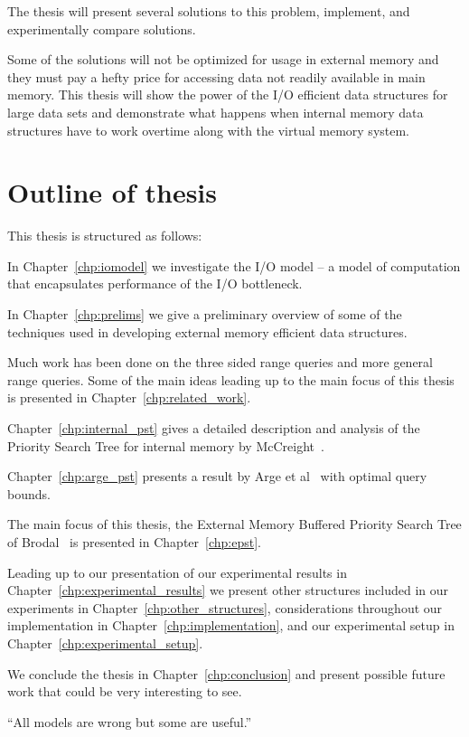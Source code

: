 \documentclass[twoside,11pt,openright]{report}
\begin{document}
The thesis will present several solutions to this problem, implement, and experimentally compare solutions.

Some of the solutions will not be optimized for usage in external memory and they must pay a hefty price for accessing data not readily available in main memory. This thesis will show the power of the I/O efficient data structures for large data sets and demonstrate what happens when internal memory data structures have to work overtime along with the virtual memory system.
\clearpage
\section{Outline of thesis}
This thesis is structured as follows:

In Chapter~\ref{chp:iomodel} we investigate the I/O model -- a model of computation that encapsulates performance of the I/O bottleneck.

In Chapter~\ref{chp:prelims} we give a preliminary overview of some of the techniques used in developing external memory efficient data structures.

Much work has been done on the three sided range queries and more general range queries. Some of the main ideas leading up to the main focus of this thesis is presented in Chapter~\ref{chp:related_work}.


Chapter~\ref{chp:internal_pst} gives a detailed description and analysis of the Priority Search Tree for internal memory by McCreight~\cite{DBLP:journals/siamcomp/McCreight85}.

Chapter~\ref{chp:arge_pst} presents a result by Arge et al~\cite{arge_samoladas_vitter_1999} with optimal query bounds.

The main focus of this thesis, the External Memory Buffered Priority Search Tree of Brodal~\cite{DBLP:journals/corr/Brodal15} is presented in Chapter~\ref{chp:epst}.

Leading up to our presentation of our experimental results in Chapter~\ref{chp:experimental_results} we present other structures included in our experiments in Chapter~\ref{chp:other_structures}, considerations throughout our implementation in Chapter~\ref{chp:implementation}, and our experimental setup in Chapter~\ref{chp:experimental_setup}.

We conclude the thesis in Chapter~\ref{chp:conclusion} and present possible future work that could be very interesting to see.


\begin{savequote}[0.5\textwidth]
``All models are wrong but some are useful.''
\end{savequote}
\end{document}
